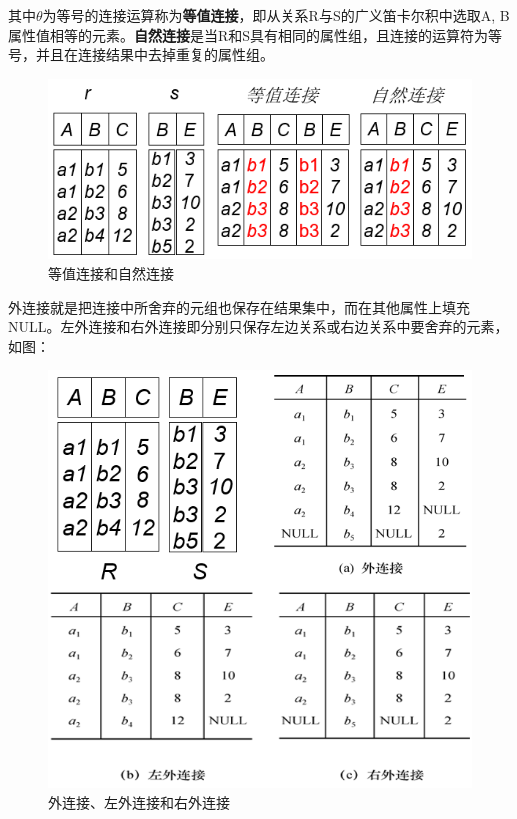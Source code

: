 \documentclass[chapter.computer_science.tex]{subfiles}
\begin{document}
其中$ \theta $为等号的连接运算称为{\bfseries 等值连接}，即从关系R与S的广义笛卡尔积中选取A, B属性值相等的元素。{\bfseries 自然连接}是当R和S具有相同的属性组，且连接的运算符为等号，并且在连接结果中去掉重复的属性组。\\
\begin{figure}[H]
    \centering
    \includegraphics[scale=0.25]{./images/0029.png}
    \caption{等值连接和自然连接}
\end{figure}
外连接就是把连接中所舍弃的元组也保存在结果集中，而在其他属性上填充NULL。左外连接和右外连接即分别只保存左边关系或右边关系中要舍弃的元素，如图：\\
\begin{figure}[H]
    \centering
    \includegraphics[scale=0.25]{./images/0030.png}
    \caption{外连接、左外连接和右外连接}
\end{figure}
\end{document}
